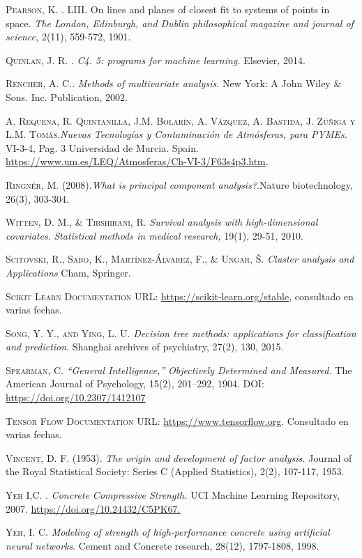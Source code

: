 \begin{thebibliography}{99}
 \textsc{Pearson, K. }. LIII. On lines and planes of closest fit to systems of points in space. \emph{The London, Edinburgh, and Dublin philosophical magazine and journal of science,} 2(11), 559-572, 1901.

\textsc{Quinlan, J. R. }. \emph{C4. 5: programs for machine learning.} Elsevier, 2014.

 \textsc{Rencher, A. C.}. \emph{Methods of multivariate analysis.} New York: A John Wiley \& Sons. Inc. Publication, 2002.

\textsc{A. Requena, R. Quintanilla, J.M. Bolarín, A. Vázquez, A. Bastida, J. Zúñiga y L.M. Tomás.}\emph{Nuevas Tecnologías y Contaminación de Atmósferas, para PYMEs.} VI-3-4, Pag. 3 Universidad de Murcia. Spain. \url{https://www.um.es/LEQ/Atmosferas/Ch-VI-3/F63s4p3.htm}.

\textsc{Ringnér, M. (2008).}\emph{What is principal component analysis?}.Nature biotechnology, 26(3), 303-304.

\textsc{Witten, D. M., \& Tibshirani, R. } \emph{Survival analysis with high-dimensional covariates}. \emph{Statistical methods in medical research,} 19(1), 29-51, 2010.

\textsc{Scitovski, R., Sabo, K., Martínez-Álvarez, F., \& Ungar, Š. } \emph{Cluster analysis and Applications} Cham, Springer.

 \textsc{Scikit Learn Documentation} URL: \url{https://scikit-learn.org/stable}, consultado en varias fechas. 

\textsc{Song, Y. Y., and Ying, L. U. } \emph{Decision tree methods: applications for classification and prediction}. Shanghai archives of psychiatry, 27(2), 130, 2015.

\textsc{Spearman, C.} \emph{“General Intelligence,” Objectively Determined and Measured.} The American Journal of Psychology, 15(2), 201–292, 1904. DOI: \url{https://doi.org/10.2307/1412107}

\textsc{Tensor Flow Documentation} URL: \url{https://www.tensorflow.org}. Consultado en varias fechas.

\textsc{Vincent, D. F. (1953).} \emph{The origin and development of factor analysis.} Journal of the Royal Statistical Society: Series C (Applied Statistics), 2(2), 107-117, 1953.



\textsc{Yeh I,C. }. \emph{Concrete Compressive Strength.} UCI Machine Learning Repository, 2007. \url{https://doi.org/10.24432/C5PK67.}

\textsc{Yeh, I. C.} \emph{ Modeling of strength of high-performance concrete using artificial neural networks}. Cement and Concrete research, 28(12), 1797-1808, 1998.

\end{thebibliography}
 